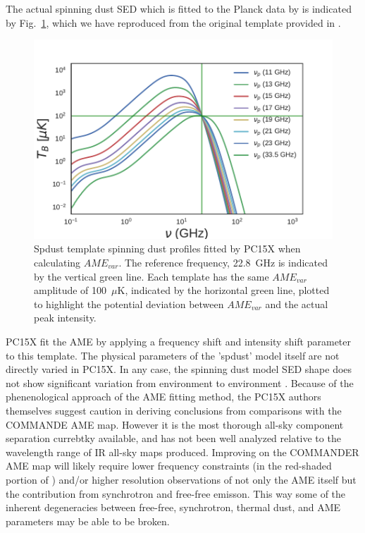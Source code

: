         The actual spinning dust SED which is fitted to the Planck data by is indicated by Fig.~\ref{fig:AME_commander_freqshift_templ}, which we have reproduced from the original template provided in \cite{ali-haimoud09}.
        \begin{figure}
          \includegraphics[width=\textwidth]{../Plots/ch_datasources/AME_commander_freqshift_templ.pdf}
          \centering
          \caption{Spdust template spinning dust profiles fitted by PC15X when calculating $AME_{var}$.  The reference frequency, 22.8~GHz is indicated by the vertical green line. Each template has the same $AME_{var}$ amplitude of 100~$\mu$K, indicated by the horizontal green line, plotted to highlight the potential deviation between $AME_{var}$ and the actual peak intensity. }
          \label{fig:AME_commander_freqshift_templ}
      \end{figure}
      PC15X fit the AME by applying a frequency shift and intensity shift parameter to this template. The physical parameters of the 'spdust' model itself are not directly varied in PC15X. In any case, the spinning dust model SED shape does not show significant variation from environment to environment \citep{ali-haimoud09}.
     Because of the phenenological approach of the AME fitting method, the PC15X authors themselves suggest caution in deriving conclusions from comparisons with the COMMANDE AME map. However it is the most thorough all-sky component separation currebtky available, and has not been well analyzed relative to the wavelength range of IR all-sky maps produced. Improving on the COMMANDER AME map will likely require lower frequency constraints (in the red-shaded portion of ) and/or higher resolution observations of not only the AME itself but the contribution from synchrotron and free-free emisson. This way some of the inherent degeneracies between free-free, synchrotron, thermal dust, and AME parameters may be able to be broken.
